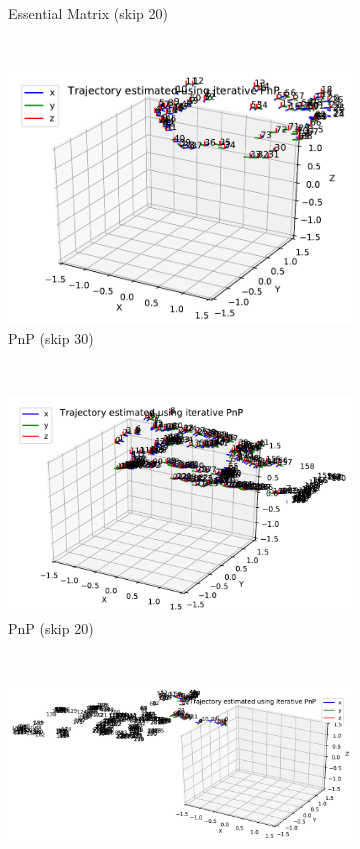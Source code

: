 \documentclass[12pt,a4paper]{article}
\begin{document}
\begin{figure}[p]
\begin{subfigure}[t]{0.3\textwidth}
        \caption{Essential Matrix (skip 20)}
        \label{f: lawn em}
      \end{subfigure} 
      \\
      \begin{subfigure}[t]{0.3\textwidth}
        \includegraphics[width=\textwidth]{../quad/basic-reg-saves-new-circle/30/atrj_pnp.pdf}
        \caption{PnP (skip 30)}
      \end{subfigure} %
      ~
      \begin{subfigure}[t]{0.3\textwidth}
        \includegraphics[width=\textwidth]{../quad/basic-reg-saves-new-rectangle-2/20/atrj_pnp.pdf}
        \caption{PnP (skip 20)}
        \label{f: rect pnp}
      \end{subfigure} %
      ~
      \begin{subfigure}[t]{0.3\textwidth}
        \includegraphics[width=\textwidth]{../quad/basic-reg-saves-new-lawnmower/20/atrj_pnp.pdf}

\end{subfigure}
\end{figure}
\end{document}
